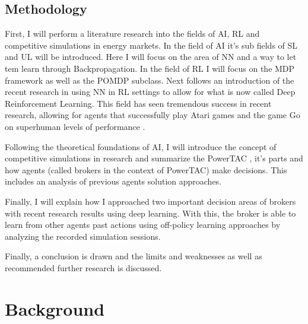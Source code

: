 \section{Methodology}
First, I will perform a literature research into the fields of \ac{AI}, \ac{RL} and competitive simulations in energy
markets. In the field of AI
it's sub fields of \ac{SL}  and \ac{UL}  will be introduced. Here I will focus on the area of \ac{NN} and a way to let
tem learn through Backpropagation. In the field of \ac{RL} I will focus on the \ac{MDP} framework as well as the
\ac{POMDP} subclass.  Next follows an introduction of the recent research in using \ac{NN} in \ac{RL} settings to allow
for what is now called Deep Reinforcement Learning. This field has seen tremendous success in recent research, allowing
for agents that successfully play Atari games and the game Go on superhuman levels of performance
\citep{proximalpolicyopt, silver2016mastering}.


Following the theoretical foundations of \ac{AI},  I will introduce the concept of competitive simulations in research
and summarize the \ac{PowerTAC} , it's parts and how agents (called brokers in the context of \ac{PowerTAC})
make decisions. This includes an analysis of previous agents solution approaches.

Finally, I will explain how I approached two important decision areas of brokers with recent research results using
deep learning.
With this, the broker is able to learn from other agents past actions using off-policy learning
approaches by analyzing the recorded simulation sessions.

Finally, a conclusion is drawn and the limits and weaknesses as well as recommended further research is discussed.

\chapter{Background}
\label{cha:background}

